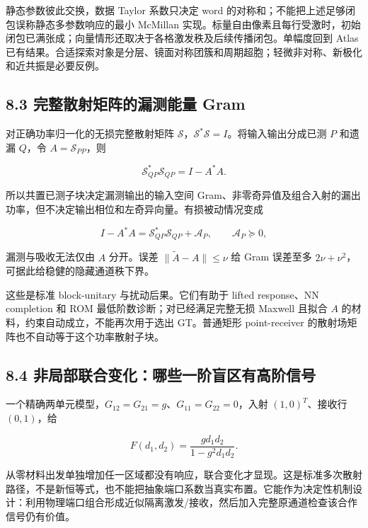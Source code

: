 \documentclass[11pt,a4paper]{article}
\begin{document}
静态参数彼此交换，数据 Taylor 系数只决定 word
的对称和；不能把上述足够闭包误称静态多参数响应的最小 McMillan
实现。标量自由像素且每行受激时，初始闭包已满张成；向量情形还取决于各格激发秩及后续传播闭包。单幅度回到
Atlas
已有结果。合适探索对象是分层、镜面对称团簇和周期超胞；轻微非对称、新极化和近共振是必要反例。

\hypertarget{ux5b8cux6574ux6563ux5c04ux77e9ux9635ux7684ux6f0fux6d4bux80fdux91cf-gram}{%
\subsection{8.3 完整散射矩阵的漏测能量
Gram}\label{ux5b8cux6574ux6563ux5c04ux77e9ux9635ux7684ux6f0fux6d4bux80fdux91cf-gram}}

对正确功率归一化的无损完整散射矩阵
\(\mathscr S\)，\(\mathscr S^*\mathscr S=I\)。将输入输出分成已测 \(P\)
和遗漏 \(Q\)，令 \(A=\mathscr S_{PP}\)，则

\[
\mathscr S_{QP}^*\mathscr S_{QP}=I-A^*A.
\]

所以共置已测子块决定漏测输出的输入空间
Gram、非零奇异值及组合入射的漏出功率，但不决定输出相位和左奇异向量。有损被动情况变成

\[
I-A^*A=\mathscr S_{QP}^*\mathscr S_{QP}+\mathcal A_P,
\qquad\mathcal A_P\succeq0,
\]

漏测与吸收无法仅由 \(A\) 分开。误差 \(\|\widetilde A-A\|\le\nu\) 给 Gram
误差至多 \(2\nu+\nu^2\)，可据此给稳健的隐藏通道秩下界。

这些是标准 block-unitary 与扰动后果。它们有助于 lifted response、NN
completion 和 ROM 最低阶数诊断；对已经满足完整无损 Maxwell 且拟合 \(A\)
的材料，约束自动成立，不能再次用于选出 GT。普通矩形 point-receiver
的散射场矩阵也不自动等于这个功率散射子块。

\hypertarget{ux975eux5c40ux90e8ux8054ux5408ux53d8ux5316ux54eaux4e9bux4e00ux9636ux76f2ux533aux6709ux9ad8ux9636ux4fe1ux53f7}{%
\subsection{8.4
非局部联合变化：哪些一阶盲区有高阶信号}\label{ux975eux5c40ux90e8ux8054ux5408ux53d8ux5316ux54eaux4e9bux4e00ux9636ux76f2ux533aux6709ux9ad8ux9636ux4fe1ux53f7}}

一个精确两单元模型，\(G_{12}=G_{21}=g\)、\(G_{11}=G_{22}=0\)，入射
\((1,0)^T\)、接收行 \((0,1)\)，给

\[
F(d_1,d_2)=\frac{g d_1d_2}{1-g^2d_1d_2}.
\]

从零材料出发单独增加任一区域都没有响应，联合变化才显现。这是标准多次散射路径，不是新恒等式，也不能把抽象端口系数当真实布置。它能作为决定性机制设计：利用物理端口组合形成近似隔离激发/接收，然后加入完整原通道检查该合作信号仍有价值。
\end{document}
